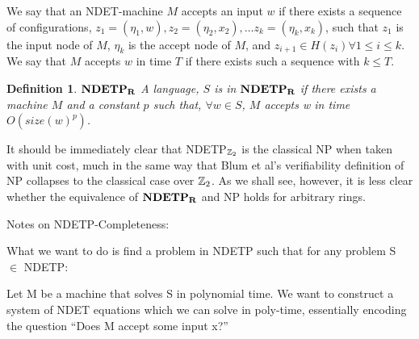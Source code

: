 \documentclass[twoside]{article}
\newtheorem{definition}{Definition}[section]
\begin{document}
We say that an NDET-machine $M$ accepts an input $w$ if there exists a
sequence of configurations, $z_1 = (\eta_1, w), z_2 = (\eta_2, x_2),
\ldots z_k = (\eta_k, x_k)$, such that $z_1$ is the input node of $M$,
$\eta_k$ is the accept node of $M$, and $z_{i+1} \in H(z_i) \forall 1
\leq i \leq k$.  We say that $M$ accepts $w$ in time $T$ if there
exists such a sequence with $k \leq T$.

\begin{definition} $\mathbf{NDETP_R}$
  A language, $S$ is in $\mathbf{NDETP_R}$ if there exists a machine $M$ and a
  constant $p$ such that, $\forall w \in S$, $M$ accepts w in time
  $O(size(w)^p)$.
\end{definition}

It should be immediately clear that NDETP$_{\mathbb{Z}_2}$ is the
classical NP when taken with unit cost, much in the same way that Blum
et al's verifiability definition of NP collapses to the classical case
over $\mathbb{Z}_2$.  As we shall see, however, it is less clear
whether the equivalence of $\mathbf{NDETP_R}$ and NP holds for arbitrary rings.

Notes on NDETP-Completeness:

What we want to do is find a problem in NDETP such that for any
problem S $\in$ NDETP:

Let M be a machine that solves S in polynomial time.  We want to
construct a system of NDET equations which we can solve in poly-time,
essentially encoding the question ``Does M accept some input x?''
\end{document}
